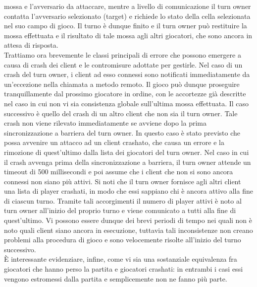 mossa e l'avversario da attaccare, mentre a livello di comunicazione il turn 
owner contatta l'avversario selezionato (target) e richiede lo stato della 
cella selezionata nel suo campo di gioco. Il turno è dunque finito e il turn 
owner può restituire la mossa effettuata e il risultato di tale mossa agli 
altri giocatori, che sono ancora in attesa di risposta.
\\
Trattiamo ora brevemente le classi principali di errore che possono emergere a 
causa di crash dei client e le contromisure adottate per gestirle. Nel caso di 
un crash del turn owner, i client ad esso connessi sono notificati 
immediatamente da un'eccezione nella chiamata a metodo remoto. Il gioco può 
dunque proseguire tranquillamente dal prossimo giocatore in ordine, con le 
accortezze già descritte nel caso in cui non vi sia consistenza globale 
sull'ultima mossa effettuata. Il caso successivo è quello del crash di un altro 
client che non sia il turn owner. Tale crash non viene rilevato immediatamente 
se avviene dopo la prima sincronizzazione a barriera del turn owner. In questo 
caso è stato previsto che possa avvenire un attacco ad un client crashato, che 
causa un errore e la rimozione di quest'ultimo dalla lista dei giocatori del 
turn owner. Nel caso in cui il crash avvenga prima della sincronizzazione a 
barriera, il turn owner attende un timeout di 500 
millisecondi e poi assume che i client che non si sono ancora connessi non siano più attivi.
Si noti che il turn owner fornisce agli altri client una lista di 
player crashati, in modo che essi sappiano chi è ancora attivo alla fine di 
ciascun turno. Tramite tali accorgimenti il numero di player attivi è noto al 
turn owner all'inizio del proprio turno e viene comunicato a tutti alla fine di 
quest'ultimo. Vi possono essere dunque dei brevi periodi di tempo nei quali non 
è noto quali client siano ancora in esecuzione, tuttavia tali inconsistenze non 
creano problemi alla procedura di gioco e sono velocemente risolte all'inizio 
del turno successivo.
\\
È interessante evidenziare, infine, come vi sia una sostanziale equivalenza fra 
giocatori che hanno perso la partita e giocatori crashati: in entrambi i casi 
essi vengono estromessi dalla partita e semplicemente non ne fanno più parte.